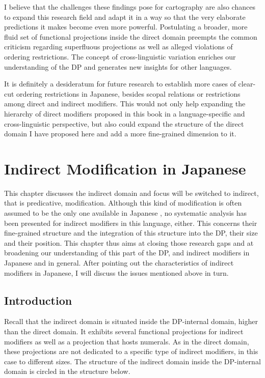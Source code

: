 \documentclass [output=book,colorlinks,citecolor=brown]{langscibook}
\begin{document}
I believe that the challenges these findings pose for cartography are also chances to expand this research field and adapt it in a way so that the very elaborate predictions it makes become even more powerful. Postulating a broader, more fluid set of functional projections inside the direct domain preempts the common criticism regarding superfluous projections as well as alleged violations of ordering restrictions. The concept of cross-linguistic variation enriches our understanding of the DP and generates new insights for other languages.

It is definitely a desideratum for future research to establish more cases of clear-cut ordering restrictions in Japanese, besides scopal relations or restrictions among direct and indirect modifiers. This would not only help expanding the hierarchy of direct modifiers proposed in this book in a language-specific and cross-linguistic perspective, but also could expand the structure of the direct domain I have proposed here and add a more fine-grained dimension to it.

\chapter{Indirect Modification in Japanese} \label{indirect japanese}

This chapter discusses the indirect domain and focus will be switched to indirect, that is predicative, modification. Although this kind of modification is often assumed to be the only one available in Japanese \citep{sproat:1991:the, baker:2003:verbal, laenzlinger:2011:elements}, no systematic analysis has been presented for indirect modifiers in this language, either. This concerns their fine-grained structure and the integration of this structure into the DP, their size and their position. This chapter thus aims at closing those research gaps and at broadening our understanding of this part of the DP, and indirect modifiers in Japanese and in general. After pointing out the characteristics of indirect modifiers in Japanese, I will discuss the issues mentioned above in turn. %

\section{Introduction}

Recall that the indirect domain is situated inside the DP-internal domain, higher than the direct domain. It exhibits several functional projections for indirect modifiers as well as a projection that hosts numerals. As in the direct domain, these projections are not dedicated to a specific type of indirect modifiers, in this case to different sizes. The structure of the indirect domain inside the DP-internal domain is circled in the structure below.
\end{document}
